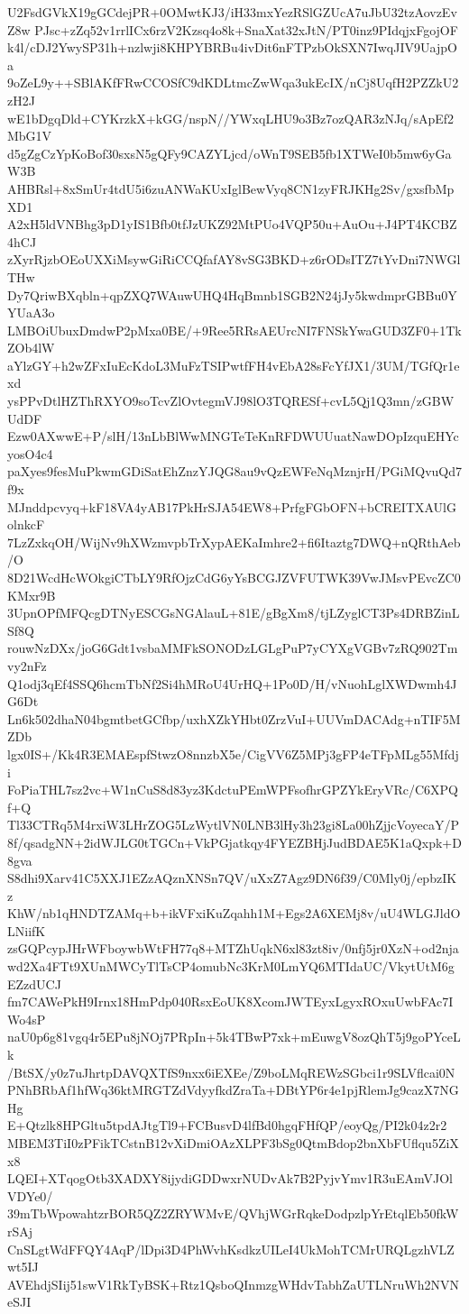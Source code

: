 U2FsdGVkX19gGCdejPR+0OMwtKJ3/iH33mxYezRSlGZUcA7uJbU32tzAovzEvZ8w
PJsc+zZq52v1rrlICx6rzV2Kzsq4o8k+SnaXat32xJtN/PT0inz9PIdqjxFgojOF
k4l/cDJ2YwySP31h+nzlwji8KHPYBRBu4ivDit6nFTPzbOkSXN7IwqJIV9UajpOa
9oZeL9y++SBlAKfFRwCCOSfC9dKDLtmcZwWqa3ukEcIX/nCj8UqfH2PZZkU2zH2J
wE1bDgqDld+CYKrzkX+kGG/nspN//YWxqLHU9o3Bz7ozQAR3zNJq/sApEf2MbG1V
d5gZgCzYpKoBof30sxsN5gQFy9CAZYLjcd/oWnT9SEB5fb1XTWeI0b5mw6yGaW3B
AHBRsl+8xSmUr4tdU5i6zuANWaKUxIglBewVyq8CN1zyFRJKHg2Sv/gxsfbMpXD1
A2xH5ldVNBhg3pD1yIS1Bfb0tfJzUKZ92MtPUo4VQP50u+AuOu+J4PT4KCBZ4hCJ
zXyrRjzbOEoUXXiMsywGiRiCCQfafAY8vSG3BKD+z6rODsITZ7tYvDni7NWGlTHw
Dy7QriwBXqbln+qpZXQ7WAuwUHQ4HqBmnb1SGB2N24jJy5kwdmprGBBu0YYUaA3o
LMBOiUbuxDmdwP2pMxa0BE/+9Ree5RRsAEUrcNI7FNSkYwaGUD3ZF0+1TkZOb4lW
aYlzGY+h2wZFxIuEcKdoL3MuFzTSIPwtfFH4vEbA28sFcYfJX1/3UM/TGfQr1exd
ysPPvDtlHZThRXYO9soTcvZlOvtegmVJ98lO3TQRESf+cvL5Qj1Q3mn/zGBWUdDF
Ezw0AXwwE+P/slH/13nLbBlWwMNGTeTeKnRFDWUUuatNawDOpIzquEHYcyosO4c4
paXyes9fesMuPkwmGDiSatEhZnzYJQG8au9vQzEWFeNqMznjrH/PGiMQvuQd7f9x
MJnddpcvyq+kF18VA4yAB17PkHrSJA54EW8+PrfgFGbOFN+bCREITXAUlGolnkcF
7LzZxkqOH/WijNv9hXWzmvpbTrXypAEKaImhre2+fi6Itaztg7DWQ+nQRthAeb/O
8D21WcdHcWOkgiCTbLY9RfOjzCdG6yYsBCGJZVFUTWK39VwJMsvPEvcZC0KMxr9B
3UpnOPfMFQcgDTNyESCGsNGAlauL+81E/gBgXm8/tjLZyglCT3Ps4DRBZinLSf8Q
rouwNzDXx/joG6Gdt1vsbaMMFkSONODzLGLgPuP7yCYXgVGBv7zRQ902Tmvy2nFz
Q1odj3qEf4SSQ6hcmTbNf2Si4hMRoU4UrHQ+1Po0D/H/vNuohLglXWDwmh4JG6Dt
Ln6k502dhaN04bgmtbetGCfbp/uxhXZkYHbt0ZrzVuI+UUVmDACAdg+nTIF5MZDb
lgx0IS+/Kk4R3EMAEspfStwzO8nnzbX5e/CigVV6Z5MPj3gFP4eTFpMLg55Mfdji
FoPiaTHL7sz2vc+W1nCuS8d83yz3KdctuPEmWPFsofhrGPZYkEryVRc/C6XPQf+Q
Tl33CTRq5M4rxiW3LHrZOG5LzWytlVN0LNB3lHy3h23gi8La00hZjjcVoyecaY/P
8f/qsadgNN+2idWJLG0tTGCn+VkPGjatkqy4FYEZBHjJudBDAE5K1aQxpk+D8gva
S8dhi9Xarv41C5XXJ1EZzAQznXNSn7QV/uXxZ7Agz9DN6f39/C0Mly0j/epbzIKz
KhW/nb1qHNDTZAMq+b+ikVFxiKuZqahh1M+Egs2A6XEMj8v/uU4WLGJldOLNiifK
zsGQPcypJHrWFboywbWtFH77q8+MTZhUqkN6xl83zt8iv/0nfj5jr0XzN+od2nja
wd2Xa4FTt9XUnMWCyTlTsCP4omubNc3KrM0LmYQ6MTIdaUC/VkytUtM6gEZzdUCJ
fm7CAWePkH9Irnx18HmPdp040RsxEoUK8XcomJWTEyxLgyxROxuUwbFAc7IWo4sP
naU0p6g81vgq4r5EPu8jNOj7PRpIn+5k4TBwP7xk+mEuwgV8ozQhT5j9goPYceLk
/BtSX/y0z7uJhrtpDAVQXTfS9nxx6iEXEe/Z9boLMqREWzSGbci1r9SLVflcai0N
PNhBRbAf1hfWq36ktMRGTZdVdyyfkdZraTa+DBtYP6r4e1pjRlemJg9cazX7NGHg
E+Qtzlk8HPGltu5tpdAJtgTl9+FCBusvD4lfBd0hgqFHfQP/eoyQg/PI2k04z2r2
MBEM3TiI0zPFikTCstnB12vXiDmiOAzXLPF3bSg0QtmBdop2bnXbFUflqu5ZiXx8
LQEI+XTqogOtb3XADXY8ijydiGDDwxrNUDvAk7B2PyjvYmv1R3uEAmVJOlVDYe0/
39mTbWpowahtzrBOR5QZ2ZRYWMvE/QVhjWGrRqkeDodpzlpYrEtqlEb50fkWrSAj
CnSLgtWdFFQY4AqP/lDpi3D4PhWvhKsdkzUILeI4UkMohTCMrURQLgzhVLZwt5IJ
AVEhdjSIij51swV1RkTyBSK+Rtz1QsboQInmzgWHdvTabhZaUTLNruWh2NVNeSJI
